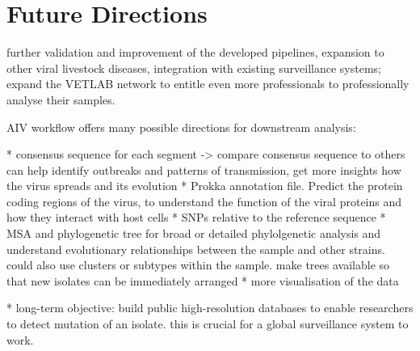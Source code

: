 \section{Future Directions}
further validation and improvement of the developed pipelines, expansion to other viral livestock diseases, integration with existing surveillance systems; expand the \ac{VETLAB} network to entitle even more professionals to professionally analyse their samples.

\ac{AIV} workflow offers many possible directions for downstream analysis:

* consensus sequence for each segment -> compare consensus sequence to others can help identify outbreaks and patterns of transmission, get more insights how the virus spreads and its evolution
* Prokka annotation file. Predict the protein coding regions of the virus, to understand the function of the viral proteins and how they interact with host cells
* SNPs relative to the reference sequence
* \ac{MSA} and phylogenetic tree for broad or detailed phylolgenetic analysis and understand evolutionary relationships between the sample and other strains. could also use clusters or subtypes within the sample. make trees available so that new isolates can be immediately arranged
* more visualisation of the data

* long-term objective: build public high-resolution databases to enable researchers to detect mutation of an isolate. this is crucial for a global surveillance system to work.
